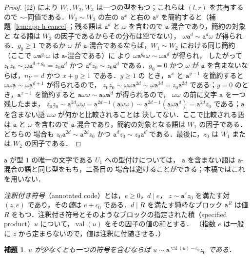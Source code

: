 \documentclass[11pt,a4paper]{ltjsarticle}
\numberwithin{equation}{section}
\theoremstyle{plain}
\newtheorem{lemma}[theorem]{補題}
\theoremstyle{definition}
\theoremstyle{remark}
\theoremstyle{plain}
\begin{document}
\begin{proof}
(I2) により $W_1,W_2,W_3$ は一つの型をもつ；これらは $(l,r)$ を共有する
ので $\sim$-同値である．$W_2\sim W_3$ の左の $\mathtt a^x$ と右の
$\mathtt a^y$ を簡約すると（補題~\ref{lem:app-h-cancel}；残る語は
$\mathtt a^d$ と $\omega$ を含むので $\mathtt a$-混合であり，簡約の対象と
なる語は $W_2$ の因子であるからその分布は空でない），
$\omega\mathtt a^d\sim\mathtt a^d\omega$ が得られる．$g_0\ge1$ であるか
$\omega$ が $\mathtt a$-混合であるならば，$W_1\sim W_2$ における同じ簡約
（ここで $\omega\mathtt a^{g_0}\omega$ は $\mathtt a$-混合である）に
より $\omega\mathtt a^{g_0}\omega\sim\omega\mathtt a^d$ が得られ，
したがって $z_0z_0\sim\omega\mathtt a^{d+g_0}=z_0\mathtt a^d$ かつ
$\mathtt a^dz_0\sim z_0\mathtt a^d$ である．$g_0=0$ かつ $\omega$ が
$\mathtt a$ を含まないならば，$n_Y=d$ かつ $x+y\ge1$ である．$y\ge1$ の
とき，$\mathtt a^x$ と $\mathtt a^{y-1}$ を簡約すると
$\omega\omega\mathtt a\sim\omega\mathtt a^{d+1}$ が得られるので，
$z_0z_0\sim\omega\omega\mathtt a^{2d}\sim\omega\mathtt a^{3d}=z_0\mathtt a^{2d}$
である；$y=0$ のとき，$\mathtt a^{x-1}$ を簡約すると
$\mathtt a\omega\omega\sim\mathtt a\omega\mathtt a^d$ が得られるので，
$\omega\omega$ の前に文字 $\mathtt a$ を一つ残したまま，
$z_0z_0\sim\mathtt a^{2d}\omega\omega=\mathtt a^{2d-1}(\mathtt a\omega\omega)\sim\mathtt a^{2d-1}(\mathtt a\omega\mathtt a^d)=\mathtt a^{2d}z_0$
である；$\mathtt a$ を含まない語 $\omega\omega$ が何かと比較されることは
決してない．ここで比較される語は $\mathtt a$ と $\omega$ を含むので
$\mathtt a$-混合であり，簡約の対象となる語は $W_1$ の因子である．どちらの
場合も $z_0\mathtt a^{2d}\sim\mathtt a^{2d}z_0$ かつ
$\mathtt a^dz_0\sim z_0\mathtt a^d$ である．最後に，$z_0$ は $W_1$ または
$W_2$ の因子である．
\end{proof}

$\mathtt a$ が型 $1$ の唯一の文字である $U_1$ への型付けについては，
$\mathtt a$ を含まない語は $\mathtt a$-混合の語と同じ型をもち，二番目の
場合は避けることができる；本稿ではこれを用いない．

\emph{注釈付き符号}（annotated code）とは，$e\ge0$，$d\mid e$，
$z\sim\mathtt a^ez_0$ を満たす対 $(z,e)$ であり，その\emph{値}は
$e+c_0$ である．$d\mid R$ を満たす純粋なブロック $\mathtt a^R$ は値 $R$
をもつ．注釈付き符号とそのようなブロックの指定された積（specified
product）$u$ について，$\operatorname{val}(u)$ をその因子の値の和とする．
（指数 $e$ は一般に $z$ から定まらないので，値は注釈に付随させる．）

\begin{lemma}
\label{lem:app-h-collapse}
$u$ が少なくとも一つの符号を含むならば
$u\sim\mathtt a^{\operatorname{val}(u)-c_0}z_0$ である．
\end{lemma}
\end{document}
